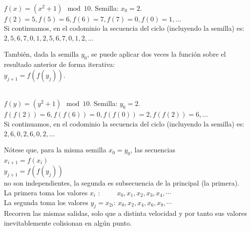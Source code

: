 \begin{ejemplo} \, \\
$f(x) = (x^2 + 1) \mod 10$. Semilla: $x_0=2$. \\
$f(2)=5, f(5)=6, f(6)=7, f(7)=0, f(0)=1, \dots$ \\
Si continuamos, en el codominio la secuencia del ciclo (incluyendo la semilla) es: \\ $2,5,6,7,0,1,2,5,6,7,0,1,2, \dots$ 
\end{ejemplo}

También, dada la semilla $y_0$, se puede aplicar dos veces la función sobre el resultado anterior de forma iterativa: \\
$y_{j+1} = f(f(y_j))$.

\begin{ejemplo} \, \\
$f(y) = (y^2 + 1) \mod 10$. Semilla: $y_0=2$. \\
$f(f(2))=6, f(f(6))=0, f(f(0))=2, f(f(2))=6, \dots$ \\
Si continuamos, en el codominio la secuencia del ciclo (incluyendo la semilla) es: \\ $2,6,0,2,6,0,2, \dots$ 
\end{ejemplo}

Nótese que, para la misma semilla $x_0=y_0$, las secuencias \\
$x_{i+1} = f(x_i)$ \\
$y_{j+1} = f(f(y_j))$ \\
no son independientes, la segunda es subsecuencia de la principal (la primera). \\
La primera toma los valores $x_i \, \,$: $\qquad \, x_0, x_1, x_2, x_3, x_4,  \cdots$ \\
La segunda toma los valores $y_j = x_{2i}$: $x_0, x_2, x_4, x_6, x_8, \cdots$ \\
Recorren las mismas salidas, solo que a distinta velocidad y por tanto sus valores inevitablemente colisionan en algún punto.

